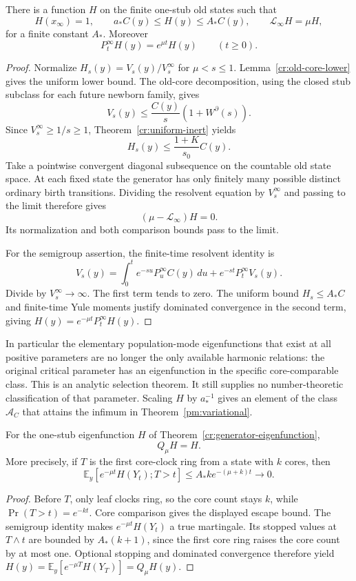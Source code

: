 \begin{theorem}
\label{cr:generator-eigenfunction}
There is a function $H$ on the finite one-stub old states such that
\[
 H(x_\infty)=1,\qquad
 a_* C(y)\le H(y)\le A_*C(y),\qquad
 \mathcal L_\infty H=\mu H,
\]
for a finite constant $A_*$.  Moreover
\[
 P_t^\infty H(y)=e^{\mu t}H(y)
 \qquad(t\ge0).
\]
\end{theorem}
\begin{proof}
Normalize $H_s(y)=V_s(y)/V_s^\infty$ for $\mu<s\le1$.
Lemma~\ref{cr:old-core-lower} gives the uniform lower bound.
The old-core decomposition, using the closed stub subclass for each
future newborn family, gives
\[
 V_s(y)\le\frac{C(y)}s(1+W^\partial(s)).
\]
Since $V_s^\infty\ge1/s\ge1$, Theorem~\ref{cr:uniform-inert} yields
\[
 H_s(y)\le\frac{1+K}{s_0}C(y).
\]
Take a pointwise convergent diagonal subsequence on the countable old
state space.  At each fixed state the generator has only finitely many
possible distinct ordinary birth transitions.  Dividing the resolvent
equation by $V_s^\infty$ and passing to the limit therefore gives
\[
 (\mu-\mathcal L_\infty)H=0.
\]
Its normalization and both comparison bounds pass to the limit.

For the semigroup assertion, the finite-time resolvent identity is
\[
 V_s(y)=\int_0^t e^{-su}P_u^\infty C(y)\,du
       +e^{-st}P_t^\infty V_s(y).
\]
Divide by $V_s^\infty\to\infty$.  The first term tends to zero.
The uniform bound $H_s\le A_*C$ and finite-time Yule moments justify
dominated convergence in the second term, giving
$H(y)=e^{-\mu t}P_t^\infty H(y)$.
\end{proof}

In particular the elementary population-mode eigenfunctions that exist
at all positive parameters are no longer the only available harmonic
relations: the original critical parameter has an eigenfunction in the
specific core-comparable class.  This is an analytic selection theorem.
It still supplies no number-theoretic classification of that parameter.
Scaling $H$ by $a_*^{-1}$ gives an element of the class
$\mathcal A_C$ that attains the infimum in
Theorem~\ref{pm:variational}.

\begin{corollary}
\label{cr:core-ring-noescape}
For the one-stub eigenfunction $H$ of
Theorem~\ref{cr:generator-eigenfunction},
\[
 Q_\mu H=H.
\]
More precisely, if $T$ is the first core-clock ring from a state with
$k$ cores, then
\[
 \mathbb E_y[e^{-\mu t}H(Y_t);T>t]
 \le A_* k e^{-(\mu+k)t}\longrightarrow0.
\]
\end{corollary}
\begin{proof}
Before $T$, only leaf clocks ring, so the core count stays $k$, while
$\Pr(T>t)=e^{-kt}$.  Core comparison gives the displayed escape bound.
The semigroup identity makes $e^{-\mu t}H(Y_t)$ a true martingale.
Its stopped values at $T\wedge t$ are bounded by $A_*(k+1)$, since
the first core ring raises the core count by at most one.  Optional
stopping and dominated convergence therefore yield
$H(y)=\mathbb E_y[e^{-\mu T}H(Y_T)]=Q_\mu H(y)$.
\end{proof}

